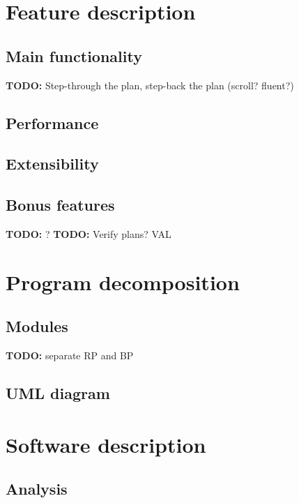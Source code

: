 \documentclass[10pt,a4paper,oneside]{article}
\newcommand{\TODO}[1]{{\textbf{TODO:} #1}} %
\begin{document}
\section{Feature description}



\subsection{Main functionality}

\TODO Step-through the plan, step-back the plan (scroll? fluent?)

\subsection{Performance}
\subsection{Extensibility}

\subsection{Bonus features} \TODO ?
\TODO Verify plans? VAL









\section{Program decomposition}

\subsection{Modules}
\TODO separate RP and BP
\subsection{UML diagram}








\section{Software description}


\subsection{Analysis}
\end{document}
